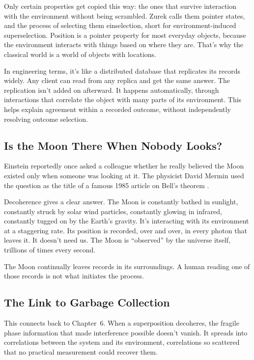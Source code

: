 Only certain properties get copied this way: the ones that survive interaction with the environment without being scrambled. Zurek calls them pointer states, and the process of selecting them einselection, short for environment-induced superselection. Position is a pointer property for most everyday objects, because the environment interacts with things based on where they are. That's why the classical world is a world of objects with locations.

In engineering terms, it's like a distributed database that replicates its records widely. Any client can read from any replica and get the same answer. The replication isn't added on afterward. It happens automatically, through interactions that correlate the object with many parts of its environment. This helps explain agreement within a recorded outcome, without independently resolving outcome selection.

\subsection{Is the Moon There When Nobody Looks?}

Einstein reportedly once asked a colleague whether he really believed the Moon existed only when someone was looking at it. The physicist David Mermin used the question as the title of a famous 1985 article on Bell's theorem \cite{mermin1985}.

Decoherence gives a clear answer. The Moon is constantly bathed in sunlight, constantly struck by solar wind particles, constantly glowing in infrared, constantly tugged on by the Earth's gravity. It's interacting with its environment at a staggering rate. Its position is recorded, over and over, in every photon that leaves it. It doesn't need us. The Moon is ``observed'' by the universe itself, trillions of times every second.

The Moon continually leaves records in its surroundings. A human reading one of those records is not what initiates the process.

\subsection{The Link to Garbage Collection}

This connects back to Chapter~6. When a superposition decoheres, the fragile phase information that made interference possible doesn't vanish. It spreads into correlations between the system and its environment, correlations so scattered that no practical measurement could recover them.


